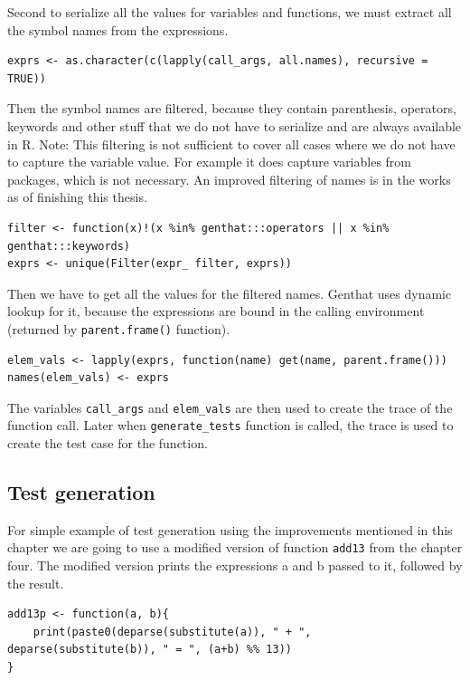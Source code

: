 \documentclass[thesis=B,english]{FITthesis}[2012/10/20]
\begin{document}
Second to serialize all the values for variables and functions, we must extract all the symbol names from the expressions.

\begin{verbatim}
exprs <- as.character(c(lapply(call_args, all.names), recursive = TRUE))
\end{verbatim}

Then the symbol names are filtered, because they contain parenthesis, operators, keywords and other stuff that we do not have to serialize and are always available in R. 
Note: This filtering is not sufficient to cover all cases where we do not have to capture the variable value. For example it does capture variables from packages, which is not necessary. An improved filtering of names is in the works as of finishing this thesis.

\begin{verbatim}
filter <- function(x)!(x %in% genthat:::operators || x %in% genthat:::keywords)
exprs <- unique(Filter(expr_ filter, exprs))
\end{verbatim}

Then we have to get all the values for the filtered names. Genthat uses dynamic lookup for it, because the expressions are bound in the calling environment (returned by \verb|parent.frame()| function).

\begin{verbatim}
elem_vals <- lapply(exprs, function(name) get(name, parent.frame()))
names(elem_vals) <- exprs
\end{verbatim}

The variables \verb|call_args| and \verb|elem_vals| are then used to create the trace of the function call. Later when \verb|generate_tests| function is called, the trace is used to create the test case for the function.

\subsection{Test generation}
For simple example of test generation using the improvements mentioned in this chapter we are going to use a modified version of function \verb|add13| from the chapter four. The modified version prints the expressions a and b passed to it, followed by the result.

\begin{verbatim}
add13p <- function(a, b){
	print(paste0(deparse(substitute(a)), " + ", deparse(substitute(b)), " = ", (a+b) %% 13))
}
\end{verbatim}
\end{document}
